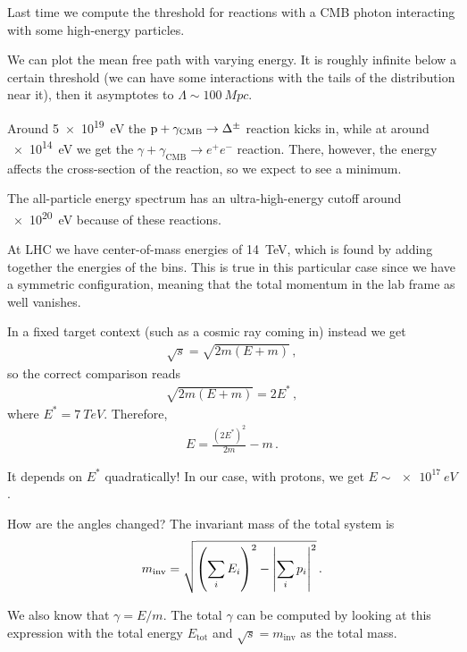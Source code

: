 \documentclass[main.tex]{subfiles}
\begin{document}

Last time we compute the threshold for reactions with a CMB photon interacting with some high-energy particles. 

We can plot the mean free path with varying energy. 
It is roughly infinite below a certain threshold (we can have some interactions with the tails of the distribution near it), then it asymptotes to \(\Lambda \sim \SI{100}{Mpc}\). 

Around \SI{5e19}{eV} the \(\ce{p} + \gamma _{\text{CMB}} \to \Delta^{\pm}\) reaction kicks in, while at around \SI{e14}{eV} we get  the \(\gamma + \gamma  _{\text{CMB}}\to e^{+} e^{-}\) reaction. 
There, however, the energy affects the cross-section of the reaction, so we expect to see a minimum. 

The all-particle energy spectrum has an ultra-high-energy cutoff around \SI{e20}{eV} because of these reactions. 

At LHC we have center-of-mass energies of \SI{14}{TeV}, which is found by adding together the energies of the bins.
This is true in this particular case since we have a symmetric configuration, meaning that the total momentum in the lab frame as well vanishes. 

In a fixed target context (such as a cosmic ray coming in) instead we get 
%
\begin{align}
\sqrt{s} = \sqrt{2 m (E + m)}
\,,
\end{align}
%
so the correct comparison reads 
%
\begin{align}
\sqrt{2 m (E +m)} = 2 E^{*}
\,,
\end{align}
%
where \(E^{*} = \SI{7}{TeV}\). Therefore, 
%
\begin{align}
E = \frac{(2 E^{*})^2}{2m} - m
\,.
\end{align}

It depends on \(E^{*}\) quadratically! 
In our case, with protons, we get \(E \sim \SI{e17}{eV}\).

How are the angles changed? 
The invariant mass of the total system is 
%
\begin{align}
m _{\text{inv}} = \sqrt{\qty(\sum _{i}E_i)^2 - \abs{ \sum _i p_i}^2}
\,.
\end{align}

We also know that \(\gamma = E / m\).
The total \(\gamma \) can be computed by looking at this expression with the total energy \(E _{\text{tot}}\) and \(\sqrt{s} = m _{\text{inv}}\) as the total mass. 
\end{document}
